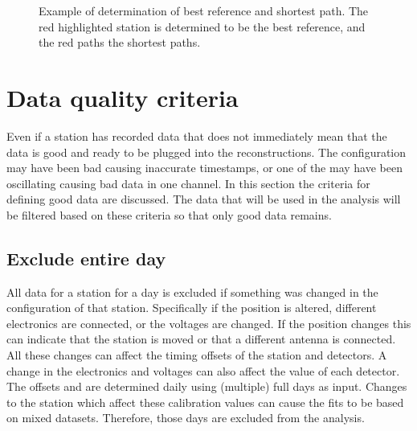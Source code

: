 \begin{figure}
    \centering
    
    \caption{Example of determination of best reference and shortest path. The red highlighted station is determined to be the best reference, and the red paths the shortest paths.}
    \label{fig:shortest_path}
\end{figure}


\section{Data quality criteria}
\label{sec:data_quality_criteria}

Even if a station has recorded data that does not immediately mean that the data is good and ready to be plugged into the reconstructions. The \gps configuration may have been bad causing inaccurate timestamps, or one of the \pmts may have been oscillating causing bad data in one channel. In this section the criteria for defining good data are discussed. The data that will be used in the analysis will be filtered based on these criteria so that only good data remains.


\subsection{Exclude entire day}

All data for a station for a day is excluded if something was changed in the configuration of that station. Specifically if the \gps position is altered, different electronics are connected, or the \pmt voltages are changed. If the \gps position changes this can indicate that the station is moved or that a different \gps antenna is connected. All these changes can affect the timing offsets of the station and detectors. A change in the electronics and voltages can also affect the \mpv value of each detector. The offsets and \mpv are determined daily using (multiple) full days as input. Changes to the station which affect these calibration values can cause the fits to be based on mixed datasets. Therefore, those days are excluded from the analysis.

